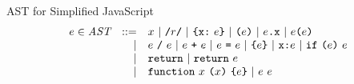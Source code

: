 \documentclass[preprint,10pt]{sigplanconf}
\begin{document}
\begin{displayfigure}{\label{fig:ast}AST for Simplified JavaScript}
\[
\begin{array}{rrl}
  e \in \textit{AST} &::=& x ~|~ \texttt{/}r\texttt{/} ~|~ 
  \texttt{\{} 
  \texttt{x}
  \texttt{:}
  ~e
  \texttt{\}}
  ~|~ \texttt{(} e \texttt{)}
  ~|~ e\texttt{.}\texttt{x} ~|~ e \texttt{(} e \texttt{)}
  \\
  &|& e~\texttt{/}~e ~|~ e ~\texttt{+}~ e ~|~ e ~\texttt{=}~ e
  ~|~ \texttt{\{} e \texttt{\}} ~|~ \texttt{x} \texttt{:} e ~|~ \texttt{if}~
  \texttt{(} e \texttt{)}~e
  \\ 
  &|& \texttt{return} ~|~ \texttt{return}~e
  \\
  &|& \texttt{function}~x~
  \texttt{(}x \texttt{)}~
  \texttt{\{} e \texttt{\}} ~|~ e~e
\end{array}
\]
\end{displayfigure}
\end{document}
